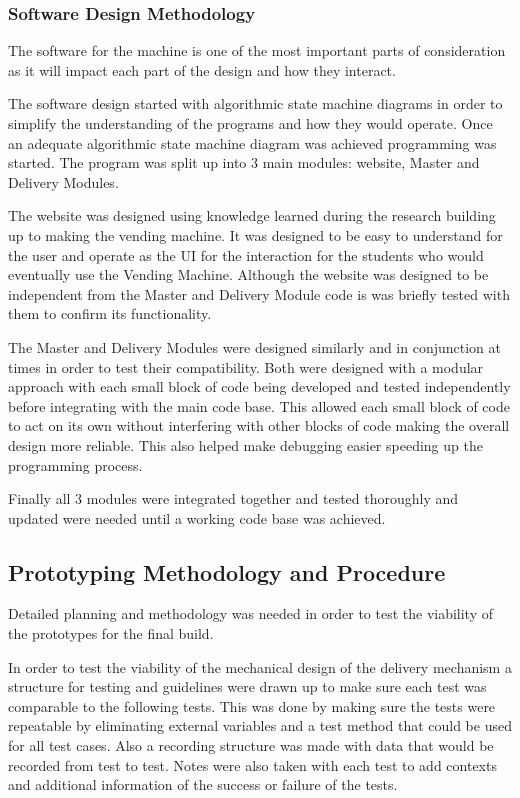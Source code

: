 \documentclass[a4paper,11pt]{article}
\numberwithin{figure}{subsection}
\begin{document}
\subsubsection{Software Design Methodology}
The software for the machine is one of the most important parts of consideration as it will impact each part of the design and how they interact.

The software design started with algorithmic state machine diagrams in order to simplify the understanding of the programs and how they would operate. Once an adequate algorithmic state machine diagram was achieved programming was started. The program was split up into 3 main modules: website, Master and Delivery Modules. 

The website was designed using knowledge learned during the research building up to making the vending machine. It was designed to be easy to understand for the user and operate as the UI for the interaction for the students who would eventually use the Vending Machine. Although the website was designed to be independent from the Master and Delivery Module code is was briefly tested with them to confirm its functionality.

The Master and Delivery Modules were designed similarly and in conjunction at times in order to test their compatibility. Both were designed with a modular approach with each small block of code being developed and tested independently before integrating with the main code base. This allowed each small block of code to act on its own without interfering with other blocks of code making the overall design more reliable. This also helped make debugging easier speeding up the programming process.

Finally all 3 modules were integrated together and tested thoroughly and updated were needed until a working code base was achieved. 

\subsection{Prototyping Methodology and Procedure}
Detailed planning and methodology was needed in order to test the viability of the prototypes for the final build.

In order to test the viability of the mechanical design of the delivery mechanism a structure for testing and guidelines were drawn up to make sure each test was comparable to the following tests. This was done by making sure the tests were repeatable by eliminating external variables and a test method that could be used for all test cases. Also a recording structure was made with data that would be recorded from test to test. Notes were also taken with each test to add contexts and additional information of the success or failure of the tests.
\end{document}
